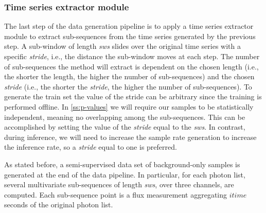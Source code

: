 \subsubsection{Time series extractor module}
\label{ss:extractor}
The last step of the data generation pipeline is to apply a time series extractor module to extract sub-sequences from the time series generated by the previous step. A sub-window of length \textit{sws} slides over the original time series with a specific \textit{stride}, i.e., the distance the sub-window moves at each step. The number of sub-sequences the method will extract is dependent on the chosen length (i.e., the shorter the length, the higher the number of sub-sequences) and the chosen \textit{stride} (i.e., the shorter the \textit{stride}, the higher the number of sub-sequences). To generate the train set the value of the stride can be arbitrary since the training is performed offline. In \autoref{ss:p-values} we will require our samples to be statistically independent, meaning no overlapping among the sub-sequences. This can be accomplished by setting the value of the \textit{stride} equal to the \textit{sws}. In contrast, during inference, we will need to increase the sample rate generation to increase the inference rate, so a \textit{stride} equal to one is preferred. 

As stated before, a semi-supervised data set of background-only samples is generated at the end of the data pipeline. In particular, for each photon list, several multivariate sub-sequences of length \textit{sws}, over three channels, are computed. Each sub-sequence point is a flux measurement aggregating $itime$ seconds of the original photon list.  


